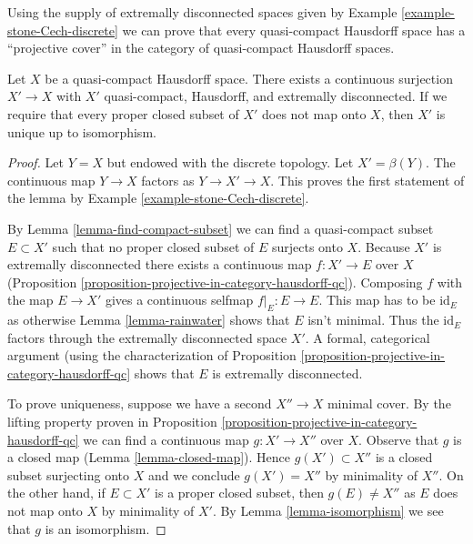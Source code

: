 \noindent
Using the supply of extremally disconnected spaces given by
Example \ref{example-stone-Cech-discrete}
we can prove that every quasi-compact Hausdorff space has a
``projective cover'' in the category of quasi-compact Hausdorff spaces.

\begin{lemma}
\label{lemma-existence-projective-cover}
Let $X$ be a quasi-compact Hausdorff space.
There exists a continuous surjection $X' \to X$ with $X'$
quasi-compact, Hausdorff, and extremally disconnected.
If we require that every proper closed subset of $X'$ does not
map onto $X$, then $X'$ is unique up to isomorphism.
\end{lemma}

\begin{proof}
Let $Y = X$ but endowed with the discrete topology. Let $X' = \beta(Y)$.
The continuous map $Y \to X$ factors as $Y \to X' \to X$. This
proves the first statement of the lemma by
Example \ref{example-stone-Cech-discrete}.

\medskip\noindent
By Lemma \ref{lemma-find-compact-subset} we can find a quasi-compact subset
$E \subset X'$ such that no proper closed subset of $E$ surjects onto $X$.
Because $X'$ is extremally disconnected there exists a continuous map
$f : X' \to E$ over $X$
(Proposition \ref{proposition-projective-in-category-hausdorff-qc}).
Composing $f$ with the map $E \to X'$ gives a continuous selfmap
$f|_E : E \to E$. This map has to be $\text{id}_E$ as otherwise
Lemma \ref{lemma-rainwater} shows that $E$ isn't minimal.
Thus the $\text{id}_E$ factors through the extremally disconnected
space $X'$. A formal, categorical argument (using the characterization of
Proposition \ref{proposition-projective-in-category-hausdorff-qc}
shows that $E$ is extremally disconnected.

\medskip\noindent
To prove uniqueness, suppose we have a second $X'' \to X$
minimal cover. By the lifting property proven in
Proposition \ref{proposition-projective-in-category-hausdorff-qc}
we can find a continuous map $g : X' \to X''$ over $X$.
Observe that $g$ is a closed map (Lemma \ref{lemma-closed-map}).
Hence $g(X') \subset X''$ is a closed subset surjecting onto $X$
and we conclude $g(X') = X''$ by minimality of $X''$.
On the other hand, if $E \subset X'$ is a proper closed subset,
then $g(E) \not = X''$ as $E$ does not map onto $X$ by minimality
of $X'$. By Lemma \ref{lemma-isomorphism} we see that $g$ is an isomorphism.
\end{proof}

